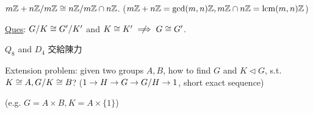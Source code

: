 \begin{example}
  ${m\mathbb{Z} + n\mathbb{Z}}/{m\mathbb{Z}} \cong {n\mathbb{Z}}/{m\mathbb{Z} \cap n\mathbb{Z}}$.
  ($m\mathbb{Z} + n\mathbb{Z} = \gcd(m,n)\mathbb{Z}, m\mathbb{Z} \cap n\mathbb{Z} = \operatorname{lcm}(m,n)\mathbb{Z}$)
\end{example}

\underline{Ques}: ${G}/{K} \cong {G'}/{K'}$ and $K \cong K'
\centernot\implies G \cong G'$.

\begin{example}
  $Q_8$ and $D_4$
  交給陳力
\end{example}

Extension problem: given two groups $A, B$, how to find $G$ and $K \lhd G$,
s.t. $K \cong A, {G}/{K} \cong B$?
($1 \to H \to G \to {G}/{H} \to 1$, short exact sequence)

 (e.g. $G = A \times B, K = A \times \{1\}$)

